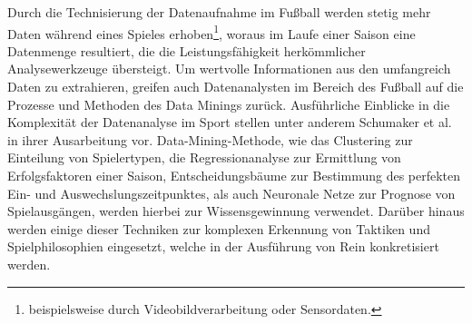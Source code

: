 Durch die Technisierung der Datenaufnahme im Fußball werden stetig mehr Daten während eines Spieles erhoben\footnote{beispielsweise durch Videobildverarbeitung oder Sensordaten.}, woraus im Laufe einer Saison eine Datenmenge resultiert, die die Leistungsfähigkeit herkömmlicher Analysewerkzeuge übersteigt. Um wertvolle Informationen aus den umfangreich Daten zu extrahieren, greifen auch Datenanalysten im Bereich des Fußball auf die Prozesse und Methoden des Data Minings zurück. Ausführliche Einblicke in die Komplexität der Datenanalyse im Sport stellen unter anderem Schumaker et al. in ihrer Ausarbeitung vor. Data-Mining-Methode, wie das Clustering zur Einteilung von Spielertypen, die Regressionanalyse zur Ermittlung von Erfolgsfaktoren einer Saison, Entscheidungsbäume zur Bestimmung des perfekten Ein- und Auswechslungszeitpunktes, als auch Neuronale Netze zur Prognose von Spielausgängen, werden hierbei zur Wissensgewinnung verwendet. Darüber hinaus werden einige dieser Techniken zur komplexen Erkennung von Taktiken und Spielphilosophien eingesetzt, welche in der Ausführung von Rein konkretisiert werden.



